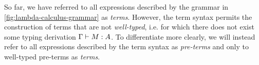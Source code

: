 So far, we have referred to all expressions described by the grammar in
\cref{fig:lambda-calculus-grammar} as \emph{terms}. However, the term syntax permits the
construction of terms that are not \emph{well-typed}, i.e. for which there does not exist
some typing derivation $\Gamma \vdash M : A$.
To differentiate more clearly, we will instead refer to all expressions described by the
term syntax as \emph{pre-terms} and only to well-typed pre-terms as \emph{terms}.
